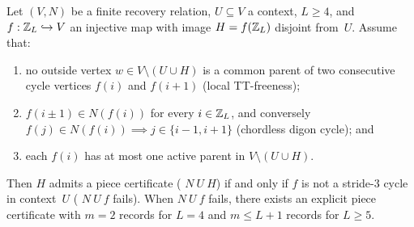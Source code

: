 \begin{theorem}\label{thm:DC}
Let $(V, N)$ be a finite recovery relation, $U \subseteq V$ a context, $L \ge 4$, and $f : \mathbb{Z}_L \hookrightarrow V$ an
injective map with image $H = f(\mathbb{Z}_L)$ disjoint from~$U$. Assume that:
\begin{enumerate}
\item no outside vertex $w \in V \setminus (U \cup H)$ is a common parent of two consecutive cycle vertices $f(i)$ and
  $f(i+1)$ (local TT-freeness);
\item $f(i \pm 1) \in N(f(i))$ for every $i \in \mathbb{Z}_L$, and conversely $f(j) \in N(f(i)) \implies j \in \{i - 1, i + 1\}$
  (chordless digon cycle); and
\item each $f(i)$ has at most one active parent in $V \setminus (U \cup H)$.
\end{enumerate}
Then $H$ admits a piece certificate ( $N\ U\ H$) if and only if $f$ is not a stride-$3$ cycle in
context~$U$ ( $N\ U\ f$ fails). When  $N\ U\ f$ fails, there exists an explicit
piece certificate with $m = 2$ records for $L = 4$ and $m \le L + 1$ records for $L \ge 5$.
\end{theorem}


